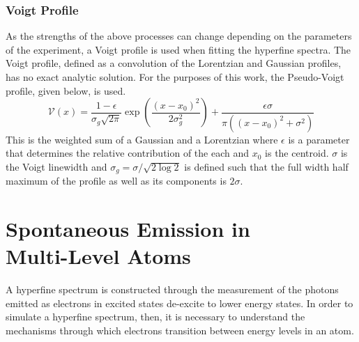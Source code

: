 \subsubsection{Voigt Profile}
As the strengths of the above processes can change depending on the parameters of the experiment, a Voigt profile is used when fitting the hyperfine spectra. The Voigt profile, defined as a convolution of the Lorentzian and Gaussian profiles, has no exact analytic solution. For the purposes of this work, the Pseudo-Voigt profile, given below, is used.
\begin{equation}
\mathcal{V}(x) = \frac{1-\epsilon}{\sigma_g\sqrt{2\pi}}\exp\left(\frac{(x-x_0)^2}{2\sigma_g^2}\right)+\frac{\epsilon\sigma}{\pi((x-x_0)^2+\sigma^2)}
\end{equation}
This is the weighted sum of a Gaussian and a Lorentzian where $\epsilon$ is a parameter that determines the relative contribution of the each and $x_0$ is the centroid. $\sigma$ is the Voigt linewidth and $\sigma_g = \sigma/\sqrt{2\log{2}}$ is defined such that the full width half maximum of the profile as well as its components is $2\sigma$\cite{voigt}.
\section{Spontaneous Emission in \\ Multi-Level Atoms}
\label{ALI}
A hyperfine spectrum is constructed through the measurement of the photons emitted as electrons in excited states de-excite to lower energy states. In order to simulate a hyperfine spectrum, then, it is necessary to understand the mechanisms through which electrons transition between energy levels in an atom.

